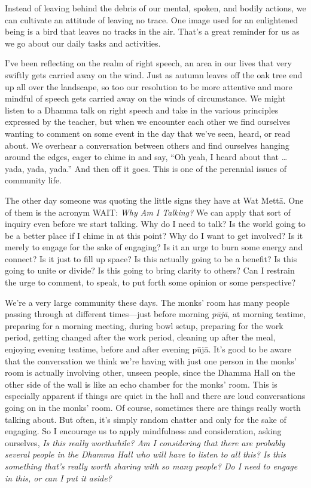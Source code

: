 Instead of leaving behind the debris of our mental, spoken, and bodily 
actions, we can cultivate an attitude of leaving no trace. One image 
used for an enlightened being is a bird that leaves no tracks in the 
air. That's a great reminder for us as we go about our daily tasks and 
activities.


I've been reflecting on the realm of right speech, an area in our lives 
that very swiftly gets carried away on the wind. Just as autumn leaves 
off the oak tree end up all over the landscape, so too our resolution 
to be more attentive and more mindful of speech gets carried away on 
the winds of circumstance. We might listen to a Dhamma talk on right 
speech and take in the various principles expressed by the teacher, but 
when we encounter each other we find ourselves wanting to comment on 
some event in the day that we've seen, heard, or read about. We 
overhear a conversation between others and find ourselves hanging 
around the edges, eager to chime in and say, ``Oh yeah, I heard about 
that \ldots{} yada, yada, yada.'' And then off it goes. This is one of 
the perennial issues of community life.

The other day someone was quoting the little signs they have at Wat 
Mettā. One of them is the acronym WAIT: \emph{Why Am I Talking?} We 
can apply that sort of inquiry even before we start talking. Why do I 
need to talk? Is the world going to be a better place if I chime in at 
this point? Why do I want to get involved? Is it merely to engage for 
the sake of engaging? Is it an urge to burn some energy and connect? Is 
it just to fill up space? Is this actually going to be a benefit? Is 
this going to unite or divide? Is this going to bring clarity to 
others? Can I restrain the urge to comment, to speak, to put forth some 
opinion or some perspective?

We're a very large community these days. The monks' room has many 
people passing through at different times---just before morning 
\emph{pūjā}, at morning teatime, preparing for a morning meeting, 
during bowl setup, preparing for the work period, getting changed after 
the work period, cleaning up after the meal, enjoying evening teatime, 
before and after evening pūjā. It's good to be aware that the 
conversation we think we're having with just one person in the monks' 
room is actually involving other, unseen people, since the Dhamma Hall 
on the other side of the wall is like an echo chamber for the monks' 
room. This is especially apparent if things are quiet in the hall and 
there are loud conversations going on in the monks' room. Of course, 
sometimes there are things really worth talking about. But often, it's 
simply random chatter and only for the sake of engaging. So I encourage 
us to apply mindfulness and consideration, asking ourselves, \emph{Is 
this really worthwhile? Am I considering that there are probably 
several people in the Dhamma Hall who will have to listen to all this? 
Is this something that's really worth sharing with so many people? Do I 
need to engage in this, or can I put it aside?}

